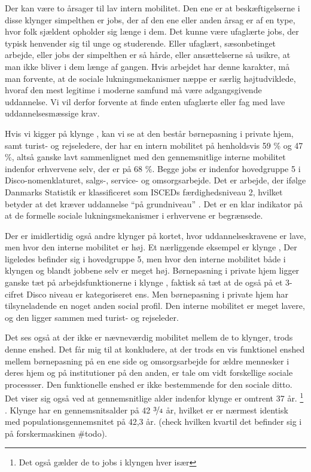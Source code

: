 Der kan være to årsager til lav intern mobilitet. Den ene er at beskæftigelserne i disse klynger simpelthen er jobs, der af den ene eller anden årsag er af en type, hvor folk sjældent opholder sig længe i dem. Det kunne være ufaglærte jobs, der typisk henvender sig til unge og studerende. Eller ufaglært, sæsonbetinget arbejde, eller jobs der simpelthen er så hårde, eller ansættelserne så usikre, at man ikke bliver i dem længe af gangen. Hvis arbejdet har denne karakter, må man forvente, at de sociale lukningsmekanismer næppe er særlig højtudviklede, hvoraf den mest legitime i moderne samfund må være adgangsgivende uddannelse. Vi vil derfor forvente at finde enten ufaglærte eller fag med lave uddannelsesmæssige krav. 

Hvis vi kigger på klynge , kan vi se at den består børnepasning i private hjem, samt turist- og rejseledere, der har en intern mobilitet på henholdsvis  59 \% og 47 \%, altså ganske lavt sammenlignet med den gennemsnitlige interne mobilitet indenfor erhvervene selv, der er på 68 \%.  Begge jobs er indenfor hovedgruppe 5 i Disco-nomenklaturet, salgs-, service- og omsorgsarbejde. Det er arbejde, der ifølge Danmarks Statistik er klassificeret som ISCEDs færdighedsniveau 2, hvilket betyder at det kræver uddannelse “på grundniveau” \parencite[tabel 1]{DSTDISCO88}. Det er en klar indikator på at de formelle sociale lukningsmekanismer i erhvervene er begrænsede. 


Der er imidlertidig også andre klynger på kortet, hvor uddannelseskravene er lave, men hvor den interne mobilitet er høj. Et nærliggende eksempel er klynge , Der ligeledes befinder sig i hovedgruppe 5, men hvor den interne mobilitet både i klyngen og blandt jobbene selv er meget høj. Børnepasning i private hjem ligger ganske tæt på arbejdsfunktionerne i klynge , faktisk så tæt at de også på et 3-cifret Disco niveau er kategoriseret ens. Men børnepasning i private hjem har tilsyneladende en noget anden social profil. Den interne mobilitet er meget lavere, og den ligger sammen med turist- og rejseleder. 

Det ses også at der ikke er nævneværdig mobilitet mellem de to klynger, trods denne enshed. Det får mig til at konkludere, at der trods en vis funktionel enshed mellem børnepasning på en ene side og omsorgsarbejde for ældre mennesker i deres hjem og på institutioner på den anden, er tale om vidt forskellige sociale processser. Den funktionelle enshed er ikke bestemmende for den sociale ditto. Det viser sig også ved at gennemsnitlige alder indenfor klynge  er omtrent 37 år.%
%
\footnote{Det også gælder de to jobs i klyngen hver især}%
%
. Klynge  har en gennemsnitsalder på 42 $\nicefrac{3}{4}$ år, hvilket er er nærmest identisk med populationsgennemsnitet på 42,3 år. (check hvilken kvartil det befinder sig i på forskermaskinen \#todo). 






















